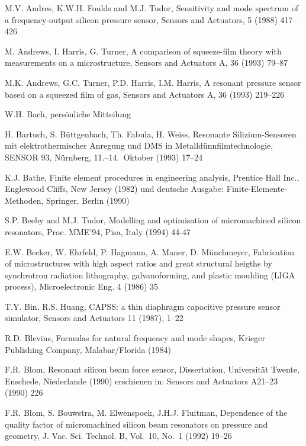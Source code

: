 \begin{thebibliography}{xxx}
 M.V. Andres, K.W.H. Foulds and M.J. Tudor,
 Sensitivity and mode spectrum of a frequency-output silicon pressure sensor,
 Sensors and Actuators, 5 (1988) 417--426

 M. Andrews, I. Harris, G. Turner, A comparison of squeeze-film theory with
 measurements on a microstructure, Sensors and Actuators A, 36 (1993) 79--87

 M.K. Andrews, G.C. Turner, P.D. Harris, I.M. Harris, A resonant pressure
 sensor based on a squeezed film of gas, Sensors and Actuators A, 36 (1993)
 219--226

 W.H. Bach, persönliche Mitteilung

 H. Bartuch, S. Büttgenbach, Th. Fabula, H. Weiss,
 Resonante Silizium-Sensoren mit elektrothermischer Anregung und DMS in
 Metalldünnfilmtechnologie, SENSOR 93, Nürnberg, 11.--14.~Oktober (1993)
 17--24

 K.J. Bathe, Finite element procedures in engineering analysis, Prentice Hall
 Inc., Englewood Cliffs, New Jersey (1982) und deutsche Ausgabe:
 Finite-Elemente-Methoden, Springer, Berlin (1990)

 S.P. Beeby and M.J. Tudor, Modelling and optimisation of micromachined
 silicon resonators, Proc. MME'94, Pisa, Italy (1994) 44-47

 E.W. Becker, W. Ehrfeld, P. Hagmann, A. Maner, D. Münchmeyer, Fabrication of
 microstructures with high aspect ratios and great structural heigths by
 synchrotron radiation lithography, galvanoforming, and plastic moulding
 (LIGA process), Microelectronic Eng. 4 (1986) 35

 T.Y. Bin, R.S. Huang, {\sf CAPSS}: a thin diaphragm capacitive pressure
 sensor simulator, Sensors and Actuators 11 (1987), 1--22

 R.D. Blevins, Formulas for natural frequency and mode shapes,
 Krieger Publishing Company, Malabar/Florida (1984)

 F.R. Blom, Resonant silicon beam force sensor, Dissertation,
 Universität Twente, Enschede, Niederlande (1990)
 erschienen in: Sensors and Actuators A21--23 (1990) 226

 F.R. Blom, S. Bouwstra, M. Elwenspoek, J.H.J. Fluitman, Dependence of the
 quality factor of micromachined silicon beam resonators on pressure and
 geometry, J. Vac. Sci. Technol. B, Vol.~10, No.~1 (1992) 19--26


\end{thebibliography}
